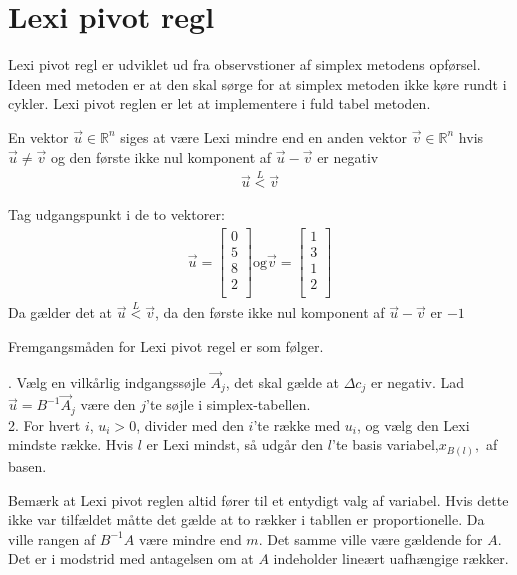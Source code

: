 \section{Lexi pivot regl}
Lexi pivot regl er udviklet ud fra observstioner af simplex metodens opførsel. Ideen med metoden er at den skal sørge for at simplex metoden ikke køre rundt i cykler. Lexi pivot reglen er let at implementere i fuld tabel metoden. 
\begin{defn}
En vektor $\vec{u} \in \mathds{R}^n$ siges at være Lexi mindre end en anden vektor $\vec{v} \in \mathds{R}^n$ hvis $\vec{u} \neq \vec{v}$ og den første ikke nul komponent af $\vec{u}-\vec{v}$ er negativ 
\begin{align*}
\vec{u} \overset{L}{<} \vec{v}
\end{align*}
\end{defn}
\begin{eks}
Tag udgangspunkt i de to vektorer: 
\begin{align*}
\vec{u}=
\begin{bmatrix}
0\\
5\\
8\\
2\\
\end{bmatrix}
\text{og}
\vec{v}= 
\begin{bmatrix}
1\\
3\\
1\\
2\\
\end{bmatrix}
\end{align*}
Da gælder det at $\vec{u} \overset{L}{<} \vec{v}$, da den første ikke nul komponent af $\vec{u}-\vec{v}$ er $-1$
\end{eks}

Fremgangsmåden for Lexi pivot regel er som følger.
  
\begin{pro}
. Vælg en vilkårlig indgangssøjle $\vec{A}_j$, det skal gælde at $\Delta c_j$ er negativ. Lad $\vec{u}=B^{-1}\vec{A}_j$ være den $j$'te søjle i simplex-tabellen. \\
2. For hvert $i$, $u_i>0$, divider med den $i$'te række med $u_i$, og vælg den Lexi mindste række. Hvis $l$ er Lexi mindst, så udgår den $l$'te basis variabel,$x_{B(l)},$ af basen. 
\end{pro}

Bemærk at Lexi pivot reglen altid fører til et entydigt valg af variabel. Hvis dette ikke var tilfældet måtte det gælde at to rækker i tabllen er proportionelle. Da ville rangen af $B^{-1}A$ være mindre end $m$. Det samme ville være gældende for $A$. Det er i modstrid med antagelsen om at $A$ indeholder lineært uafhængige rækker. 

